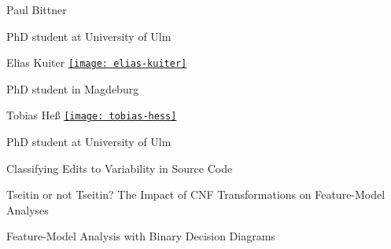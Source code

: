 \documentclass[
	aspectratio=169, %
	8pt, %
]{beamer}
\begin{document}
\begin{frame}{\insertsection}
	\vspace{-5mm}
	\begin{mycolumns}[t,columns=3,animation=none]
		\begin{note}{Paul Bittner}
			\centering
			\href{https://www.uni-ulm.de/in/sp/team/paul-maximilian-bittner/}{}

			\small PhD student at University of Ulm
		\end{note}
	\mynextcolumn
		\begin{note}{Elias Kuiter}
			\centering
			\href{https://www.dbse.ovgu.de/en/Staff/Elias+Kuiter.html}{\texttt{[image: elias-kuiter]}}

			\small PhD student in Magdeburg
		\end{note}
	\mynextcolumn
		\begin{note}{Tobias Heß}
			\centering
			\href{https://www.uni-ulm.de/in/sp/team/tobias-hess/}{\texttt{[image: tobias-hess]}}

			\small PhD student at University of Ulm
		\end{note}
	\end{mycolumns}
	\begin{mycolumns}[t,columns=3,animation=none]
		\small
		\begin{example}{}
			Classifying Edits to Variability in Source Code
		\end{example}
	\mynextcolumn
		\small
		\begin{example}{}
			Tseitin or not Tseitin? The Impact of CNF Transformations on Feature-Model Analyses
		\end{example}
	\mynextcolumn
		\small
		\begin{example}{}
			Feature-Model Analysis with Binary Decision Diagrams
		\end{example}
\end{mycolumns}
\end{frame}


\end{document}
